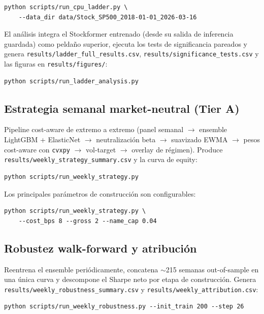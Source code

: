 \begin{verbatim}
python scripts/run_cpu_ladder.py \
    --data_dir data/Stock_SP500_2018-01-01_2026-03-16
\end{verbatim}

El análisis integra el Stockformer entrenado (desde su salida de inferencia
guardada) como peldaño superior, ejecuta los tests de significancia pareados y
genera \texttt{results/ladder\_full\_results.csv},
\texttt{results/significance\_tests.csv} y las figuras en
\texttt{results/figures/}:

\begin{verbatim}
python scripts/run_ladder_analysis.py
\end{verbatim}

\subsection{Estrategia semanal market-neutral (Tier A)}

Pipeline cost-aware de extremo a extremo (panel semanal $\rightarrow$ ensemble
LightGBM + ElasticNet $\rightarrow$ neutralización beta $\rightarrow$ suavizado
EWMA $\rightarrow$ pesos cost-aware con \texttt{cvxpy} $\rightarrow$ vol-target
$\rightarrow$ overlay de régimen). Produce
\texttt{results/weekly\_strategy\_summary.csv} y la curva de equity:

\begin{verbatim}
python scripts/run_weekly_strategy.py
\end{verbatim}

Los principales parámetros de construcción son configurables:

\begin{verbatim}
python scripts/run_weekly_strategy.py \
    --cost_bps 8 --gross 2 --name_cap 0.04
\end{verbatim}

\subsection{Robustez walk-forward y atribución}

Reentrena el ensemble periódicamente, concatena $\sim$215 semanas
out-of-sample en una única curva y descompone el Sharpe neto por etapa de
construcción. Genera \texttt{results/weekly\_robustness\_summary.csv} y
\texttt{results/weekly\_attribution.csv}:

\begin{verbatim}
python scripts/run_weekly_robustness.py --init_train 200 --step 26
\end{verbatim}

